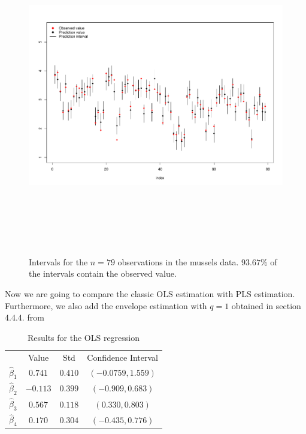 \documentclass{article}
\theoremstyle{definition}
\newcommand{\wbb}{\widehat{\boldsymbol{\beta}}}
\begin{document}
\newpage
\begin{figure}[h!]
	\centering
	\includegraphics[width=18cm,height=14cm]{CImuss.pdf}
	\caption{Intervals for the $n=79$ observations in the mussels data. $93.67\%$ of the intervals contain the observed value.}
	\label{fig:3}
\end{figure}
\newpage
Now we are going to compare the classic OLS estimation with PLS estimation. Furthermore, we also add the envelope estimation with $q=1$ obtained in section $4.4.4.$ from \cite{c}

\begin{table}[ht]
	\centering
	\caption{Results for the OLS regression}
	\begin{tabular}[t]{lccc}
		\hline
		&Value&Std & Confidence Interval \\
		$\widehat{\beta}_1$&$0.741$&$0.410$& $(-0.0759, 1.559)$\\
		$\widehat{\beta}_2$&$-0.113$&$0.399$& $(-0.909, 0.683)$\\
		$\widehat{\beta}_3$&$0.567$&$0.118$& $(0.330, 0.803)$\\
		$\widehat{\beta}_4$&$0.170$&$0.304$& $(-0.435, 0.776)$\\
		\hline
	\end{tabular}
\end{table}
\end{document}
